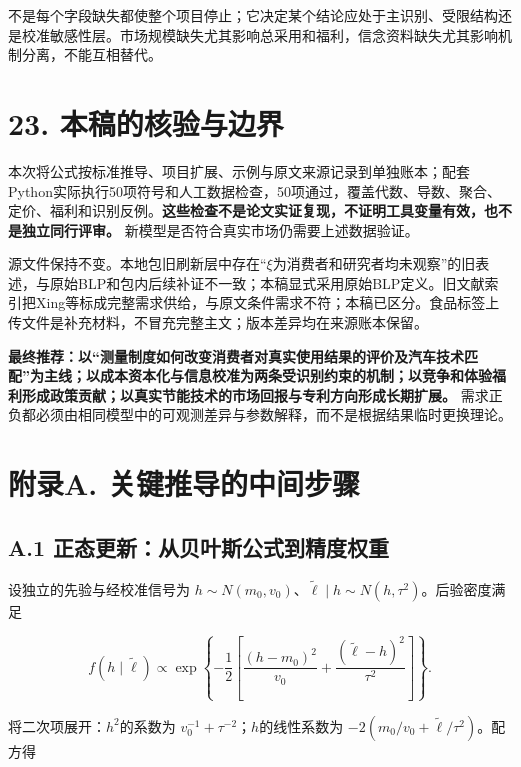 \documentclass[
  11pt,
]{article}
\begin{document}
不是每个字段缺失都使整个项目停止；它决定某个结论应处于主识别、受限结构还是校准敏感性层。市场规模缺失尤其影响总采用和福利，信念资料缺失尤其影响机制分离，不能互相替代。

\section{23.
本稿的核验与边界}\label{ux672cux7a3fux7684ux6838ux9a8cux4e0eux8fb9ux754c}

本次将公式按标准推导、项目扩展、示例与原文来源记录到单独账本；配套Python实际执行50项符号和人工数据检查，50项通过，覆盖代数、导数、聚合、定价、福利和识别反例。\textbf{这些检查不是论文实证复现，不证明工具变量有效，也不是独立同行评审。}
新模型是否符合真实市场仍需要上述数据验证。

源文件保持不变。本地包旧刷新层中存在``\(\xi\)为消费者和研究者均未观察''的旧表述，与原始BLP和包内后续补证不一致；本稿显式采用原始BLP定义。旧文献索引把Xing等标成完整需求供给，与原文条件需求不符；本稿已区分。食品标签上传文件是补充材料，不冒充完整主文；版本差异均在来源账本保留。

\textbf{最终推荐：以``测量制度如何改变消费者对真实使用结果的评价及汽车技术匹配''为主线；以成本资本化与信息校准为两条受识别约束的机制；以竞争和体验福利形成政策贡献；以真实节能技术的市场回报与专利方向形成长期扩展。}
需求正负都必须由相同模型中的可观测差异与参数解释，而不是根据结果临时更换理论。

\section{附录A.
关键推导的中间步骤}\label{ux9644ux5f55a.-ux5173ux952eux63a8ux5bfcux7684ux4e2dux95f4ux6b65ux9aa4}

\subsection{A.1
正态更新：从贝叶斯公式到精度权重}\label{a.1-ux6b63ux6001ux66f4ux65b0ux4eceux8d1dux53f6ux65afux516cux5f0fux5230ux7cbeux5ea6ux6743ux91cd}

设独立的先验与经校准信号为
\(h\sim N(m_0,v_0)\)、\(\widetilde\ell\mid h\sim N(h,\tau^2)\)。后验密度满足

\[
f(h\mid\widetilde\ell)\propto
\exp\left\{-\frac12\left[\frac{(h-m_0)^2}{v_0}
+\frac{(\widetilde\ell-h)^2}{\tau^2}\right]\right\}.
\tag{A1}
\]

将二次项展开：\(h^2\)的系数为 \(v_0^{-1}+\tau^{-2}\)；\(h\)的线性系数为
\(-2(m_0/v_0+\widetilde\ell/\tau^2)\)。配方得
\end{document}
